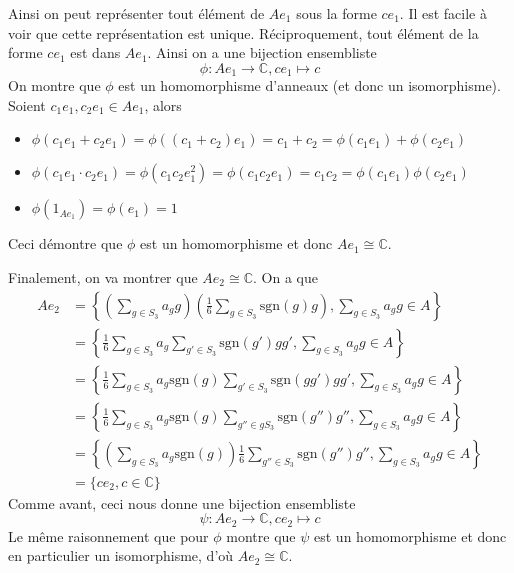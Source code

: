\documentclass[french]{article}
\newcommand{\C}{\mathbb{C}}
\newcommand{\sgn}{\mathrm{sgn}}
\begin{document}
Ainsi on peut représenter tout élément de $Ae_1$ sous la forme
$ce_1$. Il est facile à voir que cette représentation est unique.
Réciproquement, tout élément de la forme $ce_1$ est dans $Ae_1$.
Ainsi on a une bijection ensembliste
\begin{equation*}
	\phi: Ae_1 \to \C, ce_1 \mapsto c
\end{equation*}
On montre que $\phi$ est un homomorphisme d'anneaux (et donc un isomorphisme).
Soient $c_1e_1, c_2e_1 \in Ae_1$, alors
\begin{itemize}
	\item 
		$\phi(c_1e_1 + c_2e_1) = \phi((c_1 + c_2)e_1)
		= c_1 + c_2 = \phi(c_1e_1) + \phi(c_2e_1)$
	\item
		$\phi(c_1e_1\cdot c_2e_1) = \phi(c_1c_2e_1^2) = \phi(c_1c_2e_1) = c_1c_2
		= \phi(c_1e_1)\phi(c_2e_1)$
	\item
		$\phi(1_{Ae_1}) = \phi(e_1) = 1$
\end{itemize}
Ceci démontre que $\phi$ est un homomorphisme et donc $Ae_1 \cong \C$.

Finalement, on va montrer que $Ae_2 \cong \C$. On a que
\begin{align*}
	Ae_2 &= \left\{\left(\sum_{g\in S_3}a_g g\right)\left(\frac{1}{6}
	\sum_{g \in S_3} \sgn(g)g\right), \sum_{g \in S_3} a_g g \in A\right\}\\
	&= \left\{\frac{1}{6}\sum_{g\in S_3}a_g
	\sum_{g' \in S_3} \sgn(g')gg', \sum_{g \in S_3} a_g g \in A\right\}\\
	&= \left\{\frac{1}{6}\sum_{g\in S_3}a_g\sgn(g)
	\sum_{g' \in S_3} \sgn(gg')gg', \sum_{g \in S_3} a_g g \in A\right\}\\
	&= \left\{\frac{1}{6}\sum_{g\in S_3}a_g\sgn(g)
	\sum_{g'' \in gS_3} \sgn(g'')g'', \sum_{g \in S_3} a_g g \in A\right\}\\
	&= \left\{\left(\sum_{g\in S_3}a_g\sgn(g)\right)\frac{1}{6}
	\sum_{g'' \in S_3} \sgn(g'')g'', \sum_{g \in S_3} a_g g \in A\right\}\\
	&= \{ce_2, c \in \C\}
\end{align*}
Comme avant, ceci nous donne une bijection ensembliste
\begin{equation*}
	\psi: Ae_2 \to \C, ce_2 \mapsto c
\end{equation*}
Le même raisonnement que pour $\phi$ montre que $\psi$ est un homomorphisme et
donc en particulier un isomorphisme, d'où $Ae_2 \cong \C$.
\end{document}
